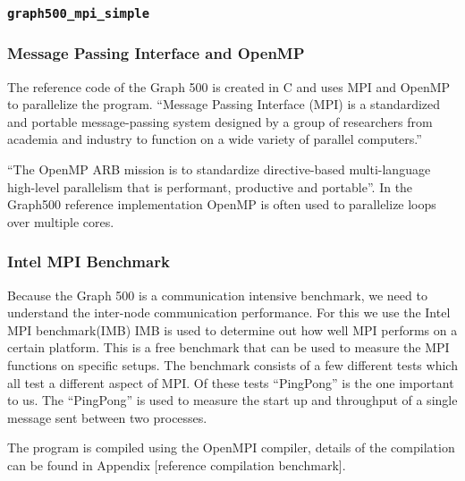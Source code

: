 \subsubsection{\texttt{graph500\_mpi\_simple}}

\subsubsection{Message Passing Interface and OpenMP}
\label{mpiopenmp}
The reference code of the Graph 500 is created in C and uses MPI and OpenMP to parallelize the program.
``Message Passing Interface (MPI) is a standardized and portable message-passing system designed by a group of researchers from academia and industry to function on a wide variety of parallel computers.\cite{mpi}''


``The OpenMP ARB mission is to standardize directive-based multi-language high-level parallelism that is performant, productive and portable''\cite{openmp}. In the Graph500 reference implementation OpenMP is often used to parallelize loops over multiple cores. 


\subsubsection{Intel MPI Benchmark}
\label{tools-imb}
Because the Graph 500 is a communication intensive benchmark, we need to understand the inter-node communication performance. For this we use the Intel MPI benchmark(IMB)  
IMB is used to determine out how well MPI performs on a certain platform. This is a free benchmark that can be used to measure the MPI functions on specific setups. The benchmark consists of a few different tests which all test a different aspect of MPI. Of these tests ``PingPong'' is the one important to us. The ``PingPong'' is used to measure the start up and throughput of a single message sent between two processes\cite{img-userguide}.

 The program is compiled using the OpenMPI compiler, details of the compilation can be found in Appendix [reference compilation benchmark].


